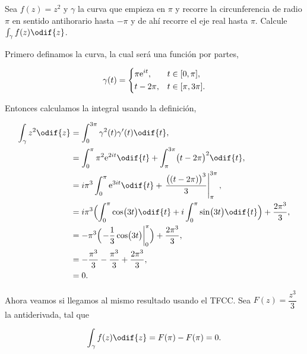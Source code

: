 \documentclass[../main.tex]{subfiles}
\begin{document}
\begin{example}
    Sea \(f(z) = z^{2}\) y \(\gamma\) la curva que empieza en \(\pi\) y recorre la
    circunferencia de radio \(\pi\) en sentido antihorario hasta \(-\pi\) y de ahí
    recorre el eje real hasta \(\pi\). Calcule \(\int_{\gamma}^{}f(z)\odif{z}\).
\end{example}

\startsolution
Primero definamos la curva, la cual será una función por partes,

\begin{equation}
    \gamma(t) =
    \begin{dcases}
        \pi \mathrm{e}^{it}, & t\in [0,\pi],    \\
        t - 2\pi,            & t\in[\pi, 3\pi].
    \end{dcases}
\end{equation}

Entonces calculamos la integral usando la definición,

\begin{align*}
    \int_{\gamma}^{}z^{2}\odif{z} & =
    \int_{0}^{3\pi}\gamma^{2}(t)\gamma^{\prime}(t)\odif{t},
    \\
    & = \int_{0}^{\pi}\pi^{2}\mathrm{e}^{2it}\odif{t} + \int_{\pi}^{3\pi}\bigl(t -
    2\pi\bigr)^{2}\odif{t},
    \\
    & = i\pi^{3} \int_{0}^{\pi}\mathrm{e}^{3it}\odif{t} +
    \eval{\dfrac{\bigl((t -
    2\pi)\bigr)^{3}}{3}}_{\pi}^{3\pi},
    \\
    & = i\pi^{3}\Bigl(\int_{0}^{\pi}\cos\bigl(3t\bigr)\odif{t} + i
    \int_{0}^{\pi}\sin\bigl(3t\bigr)\odif{t}\Bigr) + \dfrac{2\pi^{3}}{3},
    \\
    & = -\pi^{3}\Bigl(\eval{-\dfrac{1}{3}\cos\bigl(3t\bigr)}_{0}^{\pi}\Bigr) +
    \dfrac{2\pi^{3}}{3},
    \\
    & = -\dfrac{\pi^{3}}{3} - \dfrac{\pi^{3}}{3} + \dfrac{2\pi^{3}}{3},            \\
    & = 0.
\end{align*}

Ahora veamos si llegamos al mismo resultado usando el TFCC. Sea \(F(z) =
\dfrac{z^{3}}{3}\) la antiderivada, tal que

\begin{equation*}
    \int_{\gamma}^{}f(z)\odif{z} = F(\pi) - F(\pi) = 0.
\end{equation*}
\end{document}
